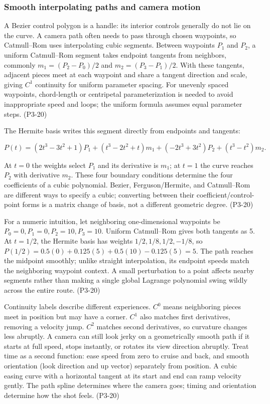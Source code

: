 \subsubsection{Smooth interpolating paths and camera motion}\label{04-visual-computing-ii-ch029-smooth-interpolating-paths-and-camera-motion}

A Bezier control polygon is a handle: its interior controls generally do not lie on the curve. A camera path often needs to pass through chosen waypoints, so Catmull--Rom uses interpolating cubic segments. Between waypoints \(P_1\) and \(P_2\), a uniform Catmull--Rom segment takes endpoint tangents from neighbors, commonly \(m_1=(P_2-P_0)/2\) and \(m_2=(P_3-P_1)/2\). With these tangents, adjacent pieces meet at each waypoint and share a tangent direction and scale, giving \(C^1\) continuity for uniform parameter spacing. For unevenly spaced waypoints, chord-length or centripetal parameterization is needed to avoid inappropriate speed and loops; the uniform formula assumes equal parameter steps. (P3-20)

The Hermite basis writes this segment directly from endpoints and tangents:

\[
P(t)=(2t^3-3t^2+1)P_1+(t^3-2t^2+t)m_1+(-2t^3+3t^2)P_2+(t^3-t^2)m_2.
\]

At \(t=0\) the weights select \(P_1\) and its derivative is \(m_1\); at \(t=1\) the curve reaches \(P_2\) with derivative \(m_2\). These four boundary conditions determine the four coefficients of a cubic polynomial. Bezier, Ferguson/Hermite, and Catmull--Rom are different ways to specify a cubic; converting between their coefficient/control-point forms is a matrix change of basis, not a different geometric degree. (P3-20)

For a numeric intuition, let neighboring one-dimensional waypoints be \(P_0=0,P_1=0,P_2=10,P_3=10\). Uniform Catmull--Rom gives both tangents as 5. At \(t=1/2\), the Hermite basis has weights \(1/2,1/8,1/2,-1/8\), so \(P(1/2)=0.5(0)+0.125(5)+0.5(10)-0.125(5)=5\). The path reaches the midpoint smoothly; unlike straight interpolation, its endpoint speeds match the neighboring waypoint context. A small perturbation to a point affects nearby segments rather than making a single global Lagrange polynomial swing wildly across the entire route. (P3-20)

Continuity labels describe different experiences. \(C^0\) means neighboring pieces meet in position but may have a corner. \(C^1\) also matches first derivatives, removing a velocity jump. \(C^2\) matches second derivatives, so curvature changes less abruptly. A camera can still look jerky on a geometrically smooth path if it starts at full speed, stops instantly, or rotates its view direction abruptly. Treat time as a second function: ease speed from zero to cruise and back, and smooth orientation (look direction and up vector) separately from position. A cubic easing curve with a horizontal tangent at its start and end can ramp velocity gently. The path spline determines where the camera goes; timing and orientation determine how the shot feels. (P3-20)

